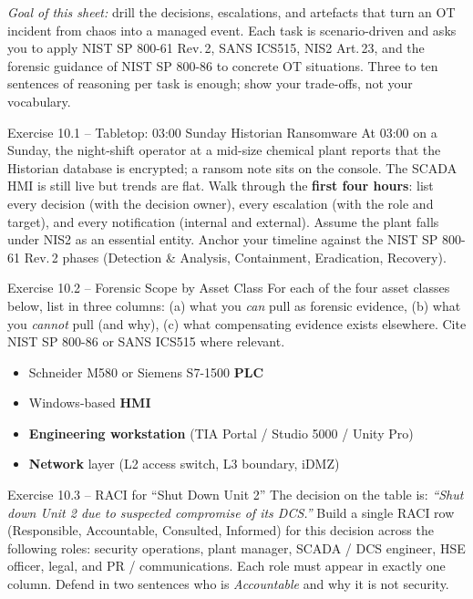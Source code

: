 \documentclass[11pt,a4paper]{article}
\begin{document}
\sheetheader

\noindent
\textit{Goal of this sheet:} drill the decisions, escalations, and artefacts that
turn an OT incident from chaos into a managed event. Each task is scenario-driven
and asks you to apply NIST SP 800-61 Rev.\,2, SANS ICS515, NIS2 Art.\,23, and the
forensic guidance of NIST SP 800-86 to concrete OT situations. Three to ten
sentences of reasoning per task is enough; show your trade-offs, not your
vocabulary.

\begin{taskbox}{Exercise 10.1 -- Tabletop: 03:00 Sunday Historian Ransomware}
At 03:00 on a Sunday, the night-shift operator at a mid-size chemical plant
reports that the Historian database is encrypted; a ransom note sits on the
console. The SCADA HMI is still live but trends are flat. Walk through the
\textbf{first four hours}: list every decision (with the decision owner), every
escalation (with the role and target), and every notification (internal and
external). Assume the plant falls under NIS2 as an essential entity. Anchor your
timeline against the NIST SP 800-61 Rev.\,2 phases (Detection \& Analysis,
Containment, Eradication, Recovery).
\end{taskbox}

\begin{taskbox}{Exercise 10.2 -- Forensic Scope by Asset Class}
For each of the four asset classes below, list in three columns: (a) what you
\emph{can} pull as forensic evidence, (b) what you \emph{cannot} pull (and why),
(c) what compensating evidence exists elsewhere. Cite NIST SP 800-86 or SANS
ICS515 where relevant.
\begin{itemize}\setlength{\itemsep}{1pt}
  \item Schneider M580 or Siemens S7-1500 \textbf{PLC}
  \item Windows-based \textbf{HMI}
  \item \textbf{Engineering workstation} (TIA Portal / Studio 5000 / Unity Pro)
  \item \textbf{Network} layer (L2 access switch, L3 boundary, iDMZ)
\end{itemize}
\end{taskbox}

\begin{taskbox}{Exercise 10.3 -- RACI for ``Shut Down Unit 2''}
The decision on the table is: \emph{``Shut down Unit 2 due to suspected
compromise of its DCS.''} Build a single RACI row (Responsible, Accountable,
Consulted, Informed) for this decision across the following roles: security
operations, plant manager, SCADA / DCS engineer, HSE officer, legal, and
PR / communications. Each role must appear in exactly one column. Defend in two
sentences who is \emph{Accountable} and why it is not security.
\end{taskbox}
\end{document}
